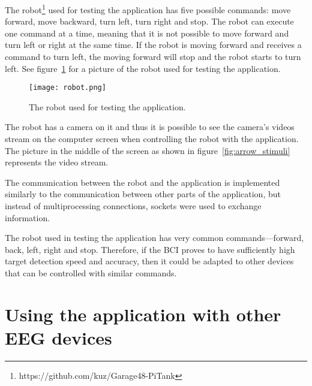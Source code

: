 The robot\footnote{https://github.com/kuz/Garage48-PiTank} used for testing the application has five possible commands: move forward, move backward, turn left, turn right and stop. The robot can execute one command at a time, meaning that it is not possible to move forward and turn left or right at the same time. If the robot is moving forward and receives a command to turn left, the moving forward will stop and the robot starts to turn left. See figure~\ref{fig:robot} for a picture of the robot used for testing the application.

\begin{figure}[h]
	\centering
	\texttt{[image: robot.png]}
	\caption{The robot used for testing the application\protect\footnotemark.}
	\label{fig:robot}
\end{figure}
The robot has a camera on it and thus it is possible to see the camera's videos stream on the computer screen when controlling the robot with the application. The picture in the middle of the screen as shown in figure~\ref{fig:arrow_stimuli} represents the video stream.

The communication between the robot and the application is implemented similarly to the communication between other parts of the application, but instead of multiprocessing connections, sockets were used to exchange information.

The robot used in testing the application has very common commands---forward, back, left, right and stop. Therefore, if the \gls{BCI} proves to have sufficiently high \gls{target} detection speed and accuracy, then it could be adapted to other devices that can be controlled with similar commands.

\section{Using the application with other EEG devices}
\label{sec:different_devices}

